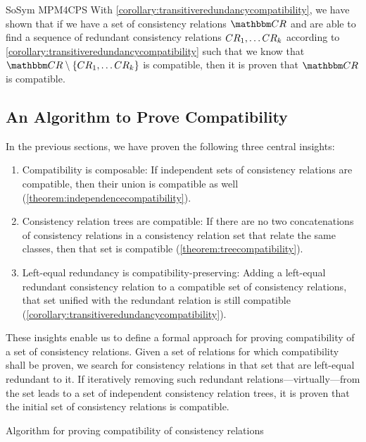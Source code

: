 \begin{copiedFrom}{SoSym MPM4CPS}
With \autoref{corollary:transitiveredundancycompatibility}, we have shown that if we have a set of consistency relations $\consistencyrelationset{CR}$ and are able to find a sequence of redundant consistency relations $CR_{1}, \dots {CR_{k}}$ according to \autoref{corollary:transitiveredundancycompatibility} such that we know that $\consistencyrelationset{CR} \setminus \setted{ \consistencyrelation{CR}{1}, \dots {\consistencyrelation{CR}{k}}}$ is compatible, then it is proven that $\consistencyrelationset{CR}$ is compatible.



\subsection{An Algorithm to Prove Compatibility} %
\label{sec:formalapproach:summary}

In the previous sections, we have proven the following three central insights:
\begin{enumerate}
    \item Compatibility is composable: If independent sets of consistency relations are compatible, then their union is compatible as well (\autoref{theorem:independencecompatibility}).
    \item Consistency relation trees are compatible: If there are no two concatenations of consistency relations in a consistency relation set that relate the same classes, then that set is compatible (\autoref{theorem:treecompatibility}).
    \item Left-equal redundancy is compatibility-preserving: Adding a left-equal redundant consistency relation to a compatible set of consistency relations, that set unified with the redundant relation is still compatible (\autoref{corollary:transitiveredundancycompatibility}).
\end{enumerate}

These insights enable us to define a formal approach for proving compatibility of a set of consistency relations.
Given a set of relations for which compatibility shall be proven, we search for consistency relations in that set that are left-equal redundant to it.
If iteratively removing such redundant relations---virtually---from the set leads to a set of independent consistency relation trees, it is proven that the initial set of consistency relations is compatible.

\begin{algorithm}
    
    \caption{Algorithm for proving compatibility of consistency relations}
    \label{algo:compatibility}
\end{algorithm}


\end{copiedFrom}
